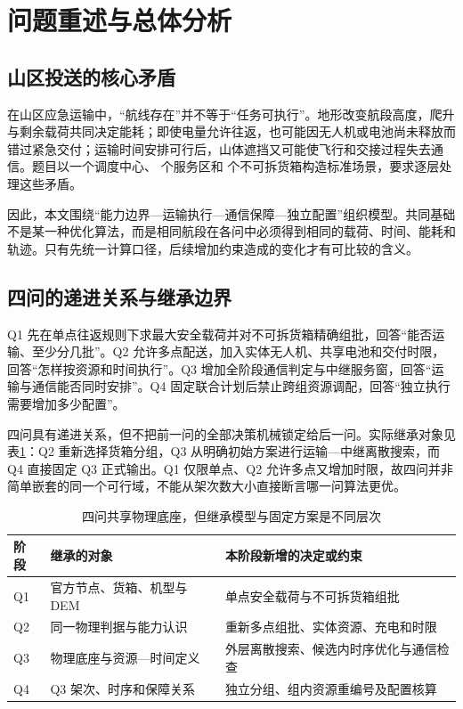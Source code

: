 \section{问题重述与总体分析}
\subsection{山区投送的核心矛盾}
在山区应急运输中，“航线存在”并不等于“任务可执行”。地形改变航段高度，爬升与剩余载荷共同决定能耗；即使电量允许往返，也可能因无人机或电池尚未释放而错过紧急交付；运输时间安排可行后，山体遮挡又可能使飞行和交接过程失去通信。题目以一个调度中心、\NumServices{} 个服务区和 \NumBoxes{} 个不可拆货箱构造标准场景\cite{problem}，要求逐层处理这些矛盾。

因此，本文围绕“能力边界—运输执行—通信保障—独立配置”组织模型。共同基础不是某一种优化算法，而是相同航段在各问中必须得到相同的载荷、时间、能耗和轨迹。只有先统一计算口径，后续增加约束造成的变化才有可比较的含义。

\subsection{四问的递进关系与继承边界}
Q1 先在单点往返规则下求最大安全载荷并对不可拆货箱精确组批，回答“能否运输、至少分几批”。Q2 允许多点配送，加入实体无人机、共享电池和交付时限，回答“怎样按资源和时间执行”。Q3 增加全阶段通信判定与中继服务窗，回答“运输与通信能否同时安排”。Q4 固定联合计划后禁止跨组资源调配，回答“独立执行需要增加多少配置”。

四问具有递进关系，但不把前一问的全部决策机械锁定给后一问。实际继承对象见表\ref{tab:inheritance}：Q2 重新选择货箱分组，Q3 从明确初始方案进行运输—中继离散搜索，而 Q4 直接固定 Q3 正式输出。Q1 仅限单点、Q2 允许多点又增加时限，故四问并非简单嵌套的同一个可行域，不能从架次数大小直接断言哪一问算法更优。
\begin{table}[htbp]\centering\caption{四问共享物理底座，但继承模型与固定方案是不同层次}\label{tab:inheritance}
\begin{tabularx}{\linewidth}{lXX}\toprule
阶段 & 继承的对象 & 本阶段新增的决定或约束\\\midrule
Q1 & 官方节点、货箱、机型与 DEM & 单点安全载荷与不可拆货箱组批\\
Q2 & 同一物理判据与能力认识 & 重新多点组批、实体资源、充电和时限\\
Q3 & 物理底座与资源—时间定义 & 外层离散搜索、候选内时序优化与通信检查\\
Q4 & Q3 架次、时序和保障关系 & 独立分组、组内资源重编号及配置核算\\\bottomrule
\end{tabularx}\end{table}

